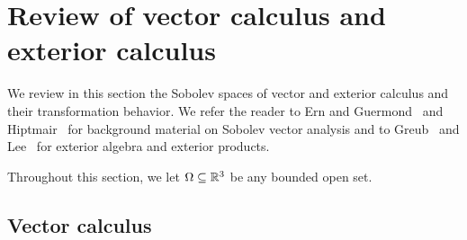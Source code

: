 \documentclass[10pt,letterpaper]{article}
\begin{document}
 








\section{Review of vector calculus and exterior calculus}\label{section:calculus}


We review in this section the Sobolev spaces of vector and exterior calculus and their transformation behavior. We refer the reader to Ern and Guermond~\cite{ern2021finite} and Hiptmair~\cite{hiptmair2002finite} for background material on Sobolev vector analysis and to Greub~\cite{greub1967multilinear} and Lee~\cite{lee2012smooth} for exterior algebra and exterior products. 

Throughout this section, we let $\Omega \subseteq {\mathbb R}^{3}$ be any bounded open set.

\subsection{Vector calculus}
\end{document}
